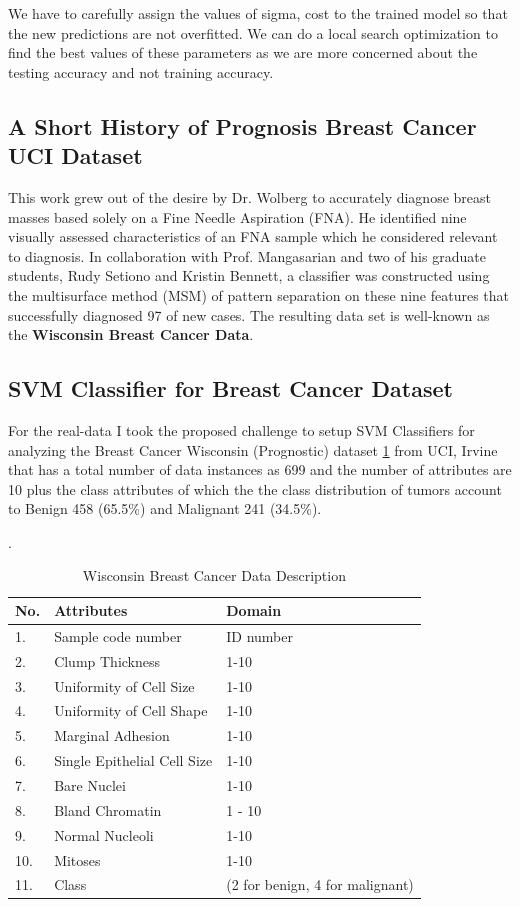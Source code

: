 \documentclass[conference]{IEEEtran}
\begin{document}
We have to carefully assign the values of sigma, cost to the trained model so that the new predictions are not overfitted. We can do a local search optimization to find the best values of these parameters as we are more concerned about the testing accuracy and not training accuracy.

\subsection{A Short History of Prognosis Breast Cancer UCI Dataset}
This work grew out of the desire by Dr. Wolberg to accurately diagnose breast masses based solely on a Fine Needle Aspiration (FNA). He identified nine visually assessed characteristics of an FNA sample which he considered relevant to diagnosis. In collaboration with Prof. Mangasarian and two of his graduate students, Rudy Setiono and Kristin Bennett, a classifier was constructed using the multisurface method (MSM) of pattern separation on these nine features that successfully diagnosed 97 of new cases. The resulting data set is well-known as the \textbf{ Wisconsin Breast Cancer Data}.

\subsection{SVM Classifier for Breast Cancer Dataset}
For the real-data I took the proposed challenge to setup SVM Classifiers for analyzing the Breast Cancer Wisconsin \cite{Mang1} \cite{Mang2} \cite{Mang1}(Prognostic) dataset \ref{table:Dataset} from UCI, Irvine that has a total number of data instances as 699 and the number of attributes are 10 plus the class attributes of which the the class distribution of tumors account to Benign 458 (65.5\%)  and Malignant 241 (34.5\%).

\begin{table}[h!]
	\center
	\caption{Wisconsin Breast Cancer Data Description}.
\label{table:Dataset}
\begin{tabular}{l|ll} 
		\hline
		\textbf{No.} & \textbf{Attributes} & \textbf{Domain} \\ 
		\hline 
		1.       &Sample code number  &ID number                 \\
		2.       &Clump Thickness     &1-10 \\
		3.       &Uniformity of Cell Size    & 1-10\\
		4.       &Uniformity of Cell Shape    & 1-10 \\
		5.       &Marginal Adhesion           &1-10 \\
		6.       &Single Epithelial Cell Size  & 1-10 \\
		7.       &Bare Nuclei                &1-10        \\
		8.       &Bland Chromatin             &1 - 10 \\
		9.       &Normal Nucleoli             &1-10 \\
		10.      &Mitoses                     &1-10      \\
		11.      &Class &(2 for benign, 4 for malignant)    \\
		\hline
	\end{tabular}
\end{table}
\end{document}

